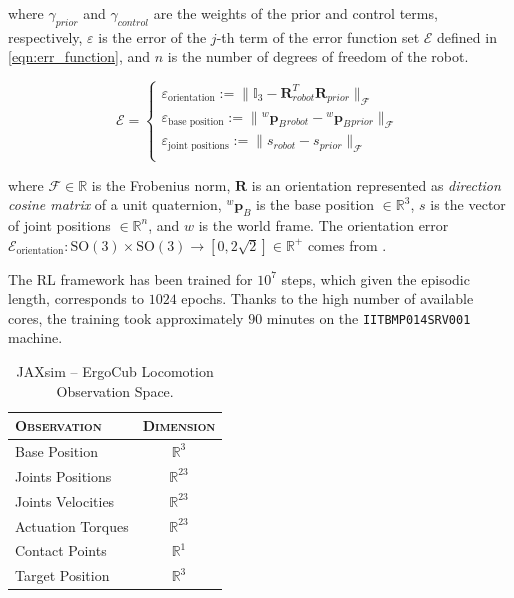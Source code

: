 where $\gamma _{prior}$ and $\gamma _{control}$ are the weights of the prior and control terms, respectively, $\varepsilon$ is the error of the $j$-th term of the error function set $\mathcal{E}$ defined in \cref{eqn:err_function}, and $n$ is the number of degrees of freedom of the robot.

\begin{equation}[right=\empheqrbrace{}]
    \label{eqn:err_function}
    \mathcal{E} =
    \begin{cases}
        \varepsilon _{\text{orientation}}    := \lVert \mathbb{I}_3 - \mathbf{R}_{robot}^T \mathbf{R}_{prior}  \rVert _{\mathcal{F}}        \\
        \varepsilon _{\text{base position}}  := \lVert {}^w \mathbf{p}_B {} _{robot} - {}^w  \mathbf{p}_B {}_{prior}  \rVert _{\mathcal{F}} \\
        \varepsilon _{\text{joint positions}}:= \lVert s _{robot} - s _{prior}  \rVert _{\mathcal{F}}                                       \\
    \end{cases}
\end{equation}

where $\mathcal{F} \in \mathbb{R}$ is the Frobenius norm, $\mathbf{R}$ is an orientation represented as \textit{direction cosine matrix} of a unit quaternion, ${}^w \mathbf{p}_B$ is the base position $\in \mathbb{R} ^3$, $s$ is the vector of joint positions $\in \mathbb{R} ^{n}$, and $w$ is the world frame.
The orientation error $\mathcal{E} _{\text{orientation}} : \mathrm{SO}(3) \times \mathrm{SO}(3) \rightarrow [0, 2\sqrt{2}] \in \mathbb{R} ^+$ comes from \citep{huynh_metrics_2009}.

The \ac{RL} framework has been trained for $10^7$ steps, which given the episodic length, corresponds to $1024$ epochs. Thanks to the high number of available cores, the training took approximately $90$ minutes on the \texttt{IITBMP014SRV001} machine.

\begin{table}
    \centering
    \label{tab:walkingobs_jaxsim}
    \begin{tabular}{l c}
        \toprule
        \textsc{Observation} & \textsc{Dimension} \\
        \midrule
        Base Position        & $\mathbb{R} ^{3}$  \\
        Joints Positions     & $\mathbb{R} ^{23}$ \\
        Joints Velocities    & $\mathbb{R} ^{23}$ \\
        Actuation Torques    & $\mathbb{R} ^{23}$ \\
        Contact Points       & $\mathbb{R} ^{1}$  \\
        Target Position      & $\mathbb{R} ^{3}$  \\
        \bottomrule
    \end{tabular}
    \caption{JAXsim -- ErgoCub Locomotion Observation Space.}
\end{table}

